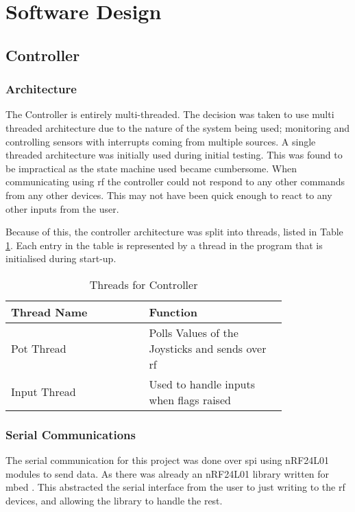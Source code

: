 \documentclass [12pt]{article}
\begin{document}
\section{Software Design}
\subsection{Controller}
\subsubsection{Architecture}


The Controller is entirely multi-threaded. The decision was taken to use  multi threaded architecture due to the nature of the system being used; monitoring and controlling sensors with interrupts coming from multiple sources. A single threaded architecture was initially used during initial testing. This was found to be impractical as the state machine used became cumbersome. When communicating using \gls{rf} the controller could not respond to any other commands from any other devices. This may not have been quick enough to react to any other inputs from the user. 

Because of this, the controller architecture was split into threads, listed in Table \ref{table:threads_for_controller}. Each entry in the table is represented by a thread in the program that is initialised during start-up. 

\begin{table}[H]
\centering
\setlength{\arrayrulewidth}{1.5pt}
\begin{tabular}{|p{0.4\linewidth}|p{0.4\linewidth}|}
\hline
\cellcolor{gray!40}Thread Name & \cellcolor{gray!40}Function \\ 
\hline
\cellcolor{gray!20}Pot Thread & \cellcolor{gray!20}Polls Values of the Joysticks and sends over \gls{rf}\\
\hline
\cellcolor{gray!20}Input Thread & \cellcolor{gray!20}Used to handle inputs when flags raised\\
\hline
\end{tabular}
\caption{Threads for Controller}
\label{table:threads_for_controller}
\end{table}

\subsubsection{Serial Communications}\label{sec:serial_communication_1}
The serial communication for this project was done over \gls{spi} using nRF24L01 modules to send data. As there was already an nRF24L01 library written for \gls{mbed} \cite{nRF24L01_lib_ref}. This abstracted the serial interface from the user to just writing to the \gls{rf} devices, and allowing the library to handle the rest. 
\end{document}

